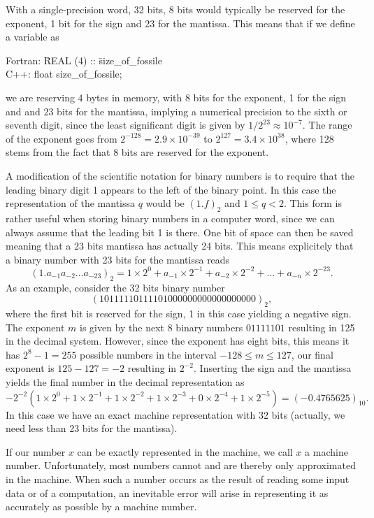 With a single-precision word, 32 bits, 8 bits would typically be reserved
for the exponent,  1 bit for the sign and 23 for the mantissa. This
means  that if we define a variable as
%
\begin{tabbing}
%
Fortran: \hspace*{1cm}\=REAL (4) :: \=size\_of\_fossile\\
C++:                    \>float      \>size\_of\_fossile;
\end{tabbing}
%
we are reserving  4 bytes in memory, with
8 bits for the exponent, 1 for the sign and  
and 23 bits for the mantissa, implying a numerical precision
to the sixth or seventh digit, since the least significant digit is
given by $1/2^{23}\approx 10^{-7}$. 
The range of the exponent goes from
$2^{-128}=2.9\times  10^{-39}$ to $2^{127}=3.4\times 10^{38}$, where 128 stems
from the fact that 8 bits are reserved for the exponent. 

A modification of the scientific notation for binary numbers is to
require that the leading binary digit 1 appears to the left of the binary point. 
In this case the representation of the mantissa $q$ would be
$(1.f)_2$ and $ 1 \le q < 2$. This form is rather useful when storing
binary numbers in a computer word, since we can always assume that the leading 
bit 1 is there. One bit of space can then be saved meaning that a 23 bits
mantissa has actually 24 bits. This means explicitely that a binary number with 23 bits 
for the mantissa reads
\[
(1.a_{-1}a_{-2}\dots a_{-23})_2=1\times 2^0+a_{-1}\times 2^{-1}
+a_{-2}\times 2^{-2}+\dots+a_{-n}\times 2^{-23}.
\]
As an example, consider the 32 bits binary number
\[
(10111110111101000000000000000000)_2,
\]
where the first bit is reserved for the sign, 1 in this case yielding a
negative sign. The exponent $m$ is given by the next 8 binary numbers
$01111101$ resulting in 125 in the decimal system. However, since the 
exponent has eight bits, this means it has  $2^8-1=255$ possible numbers in the interval
$-128 \le m \le 127$, our final
exponent is $125-127=-2$ resulting in $2^{-2}$.
Inserting the sign and the mantissa yields the final number in the decimal representation as
\[
 -2^{-2}\left(1\times 2^0+1\times 2^{-1}+
1\times 2^{-2}+1\times 2^{-3}+0\times 2^{-4}+1\times 2^{-5}\right)=(-0.4765625)_{10}.
\]
In this case we have an exact machine representation with 32 bits (actually, we need less than
23 bits for the mantissa).

If our number $x$ can be exactly represented in the machine, we call
$x$ a machine number. Unfortunately, most numbers cannot  and are thereby
only approximated in the machine. When such a number occurs as the result
of reading some input data or of a computation, an inevitable error
will arise in representing it as accurately as possible by
a machine number.

